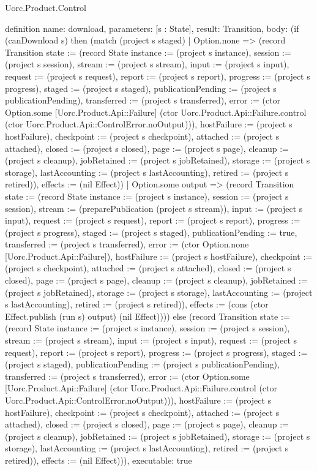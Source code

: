 \begin{lexlean}{Uorc.Product.Control}
\begin{semanticmodule}
definition{
  name: download,
  parameters: [s : State],
  result: Transition,
  body: (if (canDownload s) then (match (project s staged)
    | Option.none => (record Transition {state := (record State {instance := (project s instance), session := (project s session), stream := (project s stream), input := (project s input), request := (project s request), report := (project s report), progress := (project s progress), staged := (project s staged), publicationPending := (project s publicationPending), transferred := (project s transferred), error := (ctor Option.some [Uorc.Product.Api::Failure] (ctor Uorc.Product.Api::Failure.control (ctor Uorc.Product.Api::ControlError.noOutput))), hostFailure := (project s hostFailure), checkpoint := (project s checkpoint), attached := (project s attached), closed := (project s closed), page := (project s page), cleanup := (project s cleanup), jobRetained := (project s jobRetained), storage := (project s storage), lastAccounting := (project s lastAccounting), retired := (project s retired)}), effects := (nil Effect)})
    | Option.some output => (record Transition {state := (record State {instance := (project s instance), session := (project s session), stream := (preparePublication (project s stream)), input := (project s input), request := (project s request), report := (project s report), progress := (project s progress), staged := (project s staged), publicationPending := true, transferred := (project s transferred), error := (ctor Option.none [Uorc.Product.Api::Failure]), hostFailure := (project s hostFailure), checkpoint := (project s checkpoint), attached := (project s attached), closed := (project s closed), page := (project s page), cleanup := (project s cleanup), jobRetained := (project s jobRetained), storage := (project s storage), lastAccounting := (project s lastAccounting), retired := (project s retired)}), effects := (cons (ctor Effect.publish (run s) output) (nil Effect))})) else (record Transition {state := (record State {instance := (project s instance), session := (project s session), stream := (project s stream), input := (project s input), request := (project s request), report := (project s report), progress := (project s progress), staged := (project s staged), publicationPending := (project s publicationPending), transferred := (project s transferred), error := (ctor Option.some [Uorc.Product.Api::Failure] (ctor Uorc.Product.Api::Failure.control (ctor Uorc.Product.Api::ControlError.noOutput))), hostFailure := (project s hostFailure), checkpoint := (project s checkpoint), attached := (project s attached), closed := (project s closed), page := (project s page), cleanup := (project s cleanup), jobRetained := (project s jobRetained), storage := (project s storage), lastAccounting := (project s lastAccounting), retired := (project s retired)}), effects := (nil Effect)})),
  executable: true
}


\end{semanticmodule}
\end{lexlean}

